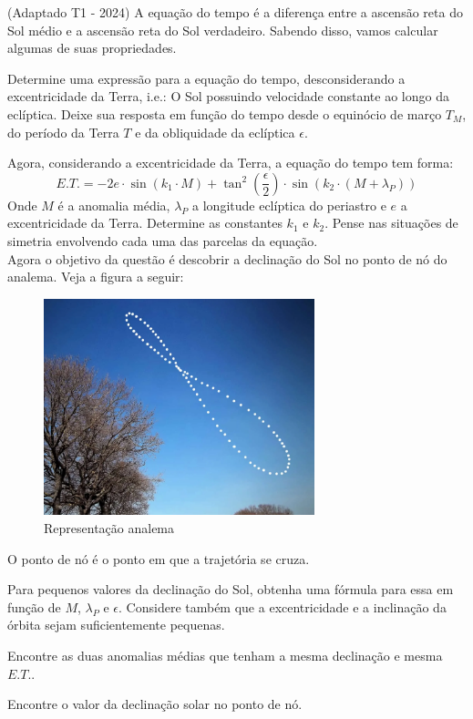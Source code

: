 \documentclass[11pt]{article}
\begin{document}
\begin{pproblem} (Adaptado T1 - 2024)
    A equação do tempo é a diferença entre a ascensão reta do Sol médio e a ascensão reta do Sol verdadeiro. Sabendo disso, vamos calcular algumas de suas propriedades.
    \begin{alternativas}
        \item Determine uma expressão para a equação do tempo, desconsiderando a excentricidade da Terra, i.e.: O Sol possuindo velocidade constante ao longo da eclíptica. Deixe sua resposta em função do tempo desde o equinócio de março \(T_M\), do período da Terra \(T\) e da obliquidade da eclíptica \(\epsilon\).
        \item Agora, considerando a excentricidade da Terra, a equação do tempo tem forma:
        \[E.T. = -2e \cdot \sin(k_1 \cdot M) + \tan^2 \left( \frac{\epsilon}{2} \right) \cdot \sin\left( k_2 \cdot (M + \lambda_P) \right)\]
        Onde \(M\) é a anomalia média, \(\lambda_P\) a longitude eclíptica do periastro e \(e\) a excentricidade da Terra. Determine as constantes \(k_1\) e \(k_2\). Pense nas situações de simetria envolvendo cada uma das parcelas da equação.
        \\
        Agora o objetivo da questão é descobrir a declinação do Sol no ponto de nó do analema. Veja a figura a seguir:
        \begin{figure}[H]
            \centering
            \includegraphics[width=0.7\textwidth]{imagens/q16.png}
            \caption{Representação analema}
        \end{figure}
        O ponto de nó é o ponto em que a trajetória se cruza.
        \item Para pequenos valores da declinação do Sol, obtenha uma fórmula para essa em função de \(M\), \(\lambda_P\) e \(\epsilon\). Considere também que a excentricidade e a inclinação da órbita sejam suficientemente pequenas.
        \item Encontre as duas anomalias médias que tenham a mesma declinação e mesma \(E.T.\).
        \item Encontre o valor da declinação solar no ponto de nó.
    \end{alternativas}
    \end{pproblem}
\end{document}
